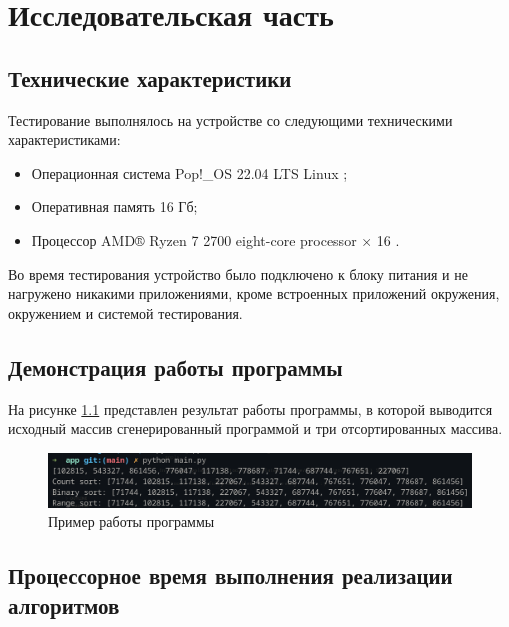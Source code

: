 \chapter{Исследовательская часть}
\section{Технические характеристики}
Тестирование выполнялось на устройстве со следующими техническими характеристиками:
\begin{itemize}
	\item Операционная система Pop!\_OS 22.04 LTS \cite{ubuntu} Linux \cite{linux};
	\item Оперативная память 16 Гб;
	\item Процессор AMD® Ryzen 7 2700 eight-core processor × 16 \cite{amd}.
\end{itemize}

Во время тестирования устройство было подключено к блоку питания и не нагружено никакими приложениями, кроме встроенных приложений окружения, окружением и системой тестирования.

\section{Демонстрация работы программы}



На рисунке \ref{demonstration} представлен результат работы программы, в которой выводится исходный массив сгенерированный программой и три отсортированных массива.

\begin{figure}[ht!]
	\begin{center}
		\captionsetup{singlelinecheck = false, justification=centerfirst}
		\includegraphics[scale=0.8]{assets/demonstation.png}
		\caption{Пример работы программы}
		\label{demonstration}
	\end{center}
	
	
\end{figure}

\newpage

\section{Процессорное время выполнения реализации алгоритмов}

